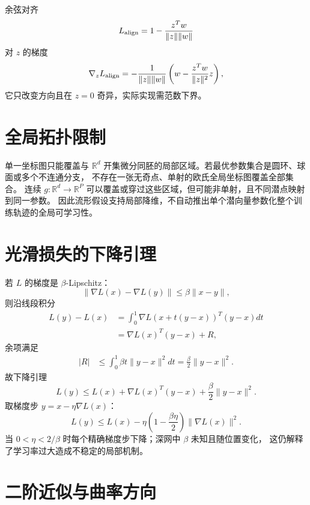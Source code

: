 \documentclass[11pt]{article}
\numberwithin{equation}{section}
\newcommand{\R}{\mathbb{R}}
\newcommand{\1}{\mathbf{1}}
\begin{document}
余弦对齐
\begin{equation}
 L_{\rm align}=1-\frac{z^Tw}{\|z\|\|w\|}
\end{equation}
对 $z$ 的梯度
\begin{equation}
 \nabla_zL_{\rm align}
 =-\frac1{\|z\|\|w\|}
 \left(w-\frac{z^Tw}{\|z\|^2}z\right),
\end{equation}
它只改变方向且在 $z=0$ 奇异，实际实现需范数下界。

\section{全局拓扑限制}

单一坐标图只能覆盖与 $\R^d$ 开集微分同胚的局部区域。若最优参数集合是圆环、球面或多个不连通分支，
不存在一张无奇点、单射的欧氏全局坐标图覆盖全部集合。
连续 $g:\R^d\to\R^P$ 可以覆盖或穿过这些区域，但可能非单射，且不同潜点映射到同一参数。
因此流形假设支持局部降维，不自动推出单个潜向量参数化整个训练轨迹的全局可学习性。

\section{光滑损失的下降引理}

若 $L$ 的梯度是 $\beta$-Lipschitz：
\begin{equation}
 \|\nabla L(x)-\nabla L(y)\|
 \le\beta\|x-y\|,
\end{equation}
则沿线段积分
\begin{align}
 L(y)-L(x)
 &=\int_0^1\nabla L(x+t(y-x))^T(y-x)dt\\
 &=\nabla L(x)^T(y-x)+R,
\end{align}
余项满足
\begin{align}
 |R|
 &\le\int_0^1\beta t\|y-x\|^2dt
 =\frac\beta2\|y-x\|^2.
\end{align}
故下降引理
\begin{equation}
 L(y)\le L(x)+\nabla L(x)^T(y-x)
 +\frac\beta2\|y-x\|^2.
\end{equation}
取梯度步 $y=x-\eta\nabla L(x)$：
\begin{equation}
 L(y)\le L(x)-\eta\left(1-\frac{\beta\eta}{2}\right)
 \|\nabla L(x)\|^2.
\end{equation}
当 $0<\eta<2/\beta$ 时每个精确梯度步下降；深网中 $\beta$ 未知且随位置变化，
这仍解释了学习率过大造成不稳定的局部机制。

\section{二阶近似与曲率方向}
\end{document}
